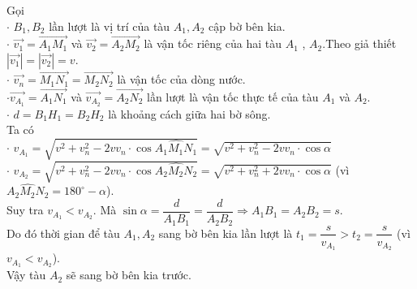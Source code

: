 \begin{bt}
{\begin{center}
		\end{center}
		Gọi\\
		$\cdot$ $B_1, B_2$ lần lượt là vị trí của tàu $A_1, A_2$ cập bờ bên kia.\\
		$\cdot$ $\overrightarrow{v_1}=\overrightarrow{A_1M_1}$ và $\overrightarrow{v_2}=\overrightarrow{A_2M_2}$  là vận tốc riêng của hai tàu $A_1$ , $A_2$.Theo giả thiết $|\overrightarrow{v_1}|=|\overrightarrow{v_2}|=v$.\\
		$\cdot$ $\overrightarrow{v_n}=\overrightarrow{M_1N_1}=\overrightarrow{M_2N_2}$ là vận tốc của dòng nước.\\
		$\cdot$$\overrightarrow{v_{A_1}}=\overrightarrow{A_1N_1}$ và $\overrightarrow{v_{A_2}}=\overrightarrow{A_2N_2}$ lần lượt là vận tốc thực tế của tàu $A_1$ và $A_2$.\\
		$\cdot$ $d=B_1H_1=B_2H_2$ là khoảng cách giữa hai bờ sông.\\
		Ta có\\
		$\cdot$ $v_{A_1}=\sqrt{v^2+v_n^2-2vv_n\cdot \cos \widehat {A_1M_1N_1} }=\sqrt{v^2+v_n^2-2vv_n\cdot \cos \alpha}$\\
		$\cdot$  $v_{A_2}=\sqrt{v^2+v_n^2-2vv_n\cdot \cos \widehat {A_2M_2N_2} }=\sqrt{v^2+v_n^2+2vv_n\cdot \cos \alpha}$ (vì $\widehat {A_2M_2N_2}=180^\circ -\alpha $).\\
		Suy tra $v_{A_1}<v_{A_2}$. Mà $\sin \alpha =\dfrac{d}{A_1B_1}=\dfrac{d}{A_2B_2}\Rightarrow A_1B_1=A_2B_2=s$. \\Do đó
		thời gian để tàu $A_1,A_2$ sang bờ bên kia  lần lượt là $t_1=\dfrac{s}{v_{A_1}}>t_2=\dfrac{s}{v_{A_2}}$ (vì $v_{A_1}<v_{A_2}$).\\
		Vậy tàu $A_2$ sẽ sang bờ bên kia trước.
	}
\end{bt}

